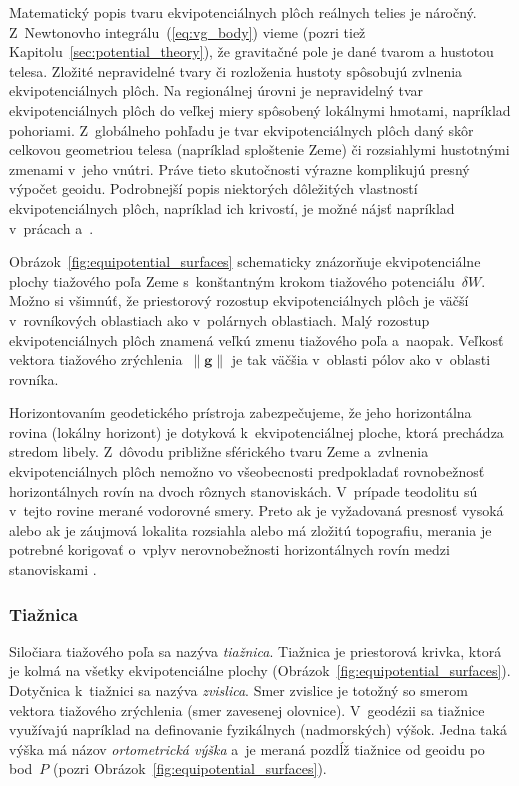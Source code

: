 \documentclass[a4paper,12pt]{book}
\let\vec\mathbf
\begin{document}
Matematický popis tvaru ekvipotenciálnych plôch reálnych telies je náročný.  
Z~Newtonovho integrálu~(\ref{eq:vg_body}) vieme (pozri tiež 
Kapitolu~\ref{sec:potential_theory}), že gravitačné pole je dané tvarom 
a hustotou telesa.  Zložité nepravidelné tvary či rozloženia hustoty spôsobujú 
zvlnenia ekvipotenciálnych plôch.  Na regionálnej úrovni je nepravidelný tvar 
ekvipotenciálnych plôch do veľkej miery spôsobený lokálnymi hmotami, napríklad 
pohoriami.  Z~globálneho pohľadu je tvar ekvipotenciálnych plôch daný skôr 
celkovou geometriou telesa (napríklad sploštenie Zeme) či rozsiahlymi 
hustotnými zmenami v~jeho vnútri.  Práve tieto skutočnosti výrazne komplikujú 
presný výpočet geoidu.  Podrobnejší popis niektorých dôležitých vlastností 
ekvipotenciálnych plôch, napríklad ich krivostí, je možné nájsť napríklad 
v~prácach \textcite{MoritzPhysicalGeodesy} a~\textcite{Janak2006}.

Obrázok~\ref{fig:equipotential_surfaces} schematicky znázorňuje ekvipotenciálne
plochy tiažového poľa Zeme s~konštantným krokom tiažového potenciálu~$\delta
W$.  Možno si všimnúť, že priestorový rozostup ekvipotenciálnych plôch je väčší
v~rovníkových oblastiach ako v~polárnych oblastiach.  Malý rozostup
ekvipotenciálnych plôch znamená veľkú zmenu tiažového poľa a~naopak.  Veľkosť
vektora tiažového zrýchlenia~$\| \vec g \|$ je tak väčšia v~oblasti pólov ako
v~oblasti rovníka.

Horizontovaním geodetického prístroja zabezpečujeme, že jeho horizontálna 
rovina (lokálny horizont) je dotyková k~ekvipotenciálnej ploche, ktorá 
prechádza stredom libely.  Z~dôvodu približne sférického tvaru Zeme a~zvlnenia 
ekvipotenciálnych plôch nemožno vo všeobecnosti predpokladať rovnobežnosť 
horizontálnych rovín na dvoch rôznych stanoviskách.  V~prípade teodolitu sú 
v~tejto rovine merané vodorovné smery.  Preto ak je vyžadovaná presnosť vysoká 
alebo ak je záujmová lokalita rozsiahla alebo má zložitú topografiu,  merania 
je potrebné korigovať o~vplyv nerovnobežnosti horizontálnych rovín medzi 
stanoviskami \parencite[pozri napríklad][]{VanicekGeodesy}.

\subsubsection{Tiažnica}
\label{sec:plumbline}

Siločiara tiažového poľa sa nazýva \emph{tiažnica}.  Tiažnica je priestorová 
krivka, ktorá je kolmá na všetky ekvipotenciálne plochy 
(Obrázok~\ref{fig:equipotential_surfaces}).  Dotyčnica k~tiažnici sa nazýva 
\emph{zvislica}.  Smer zvislice je totožný so smerom vektora tiažového 
zrýchlenia (smer zavesenej olovnice).  V~geodézii sa tiažnice využívajú 
napríklad na definovanie fyzikálnych (nadmorských) výšok.  Jedna taká výška má 
názov \emph{ortometrická výška} a~je meraná pozdĺž tiažnice od geoidu po 
bod~$P$ (pozri Obrázok~\ref{fig:equipotential_surfaces}).
\end{document}
